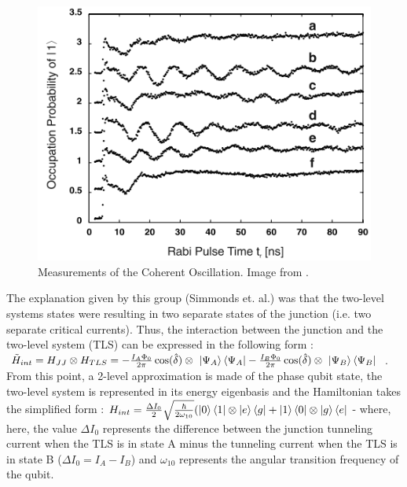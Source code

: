 \documentclass[aps,prl,reprint,groupedaddress]{revtex4-1}
\begin{document}
\begin{figure}%
\includegraphics[width=\columnwidth,natwidth=471,natheight=359]{../CohOsc.png}%
\caption{Measurements of the Coherent Oscillation. Image from \cite{simmonds_decoherence_2004}.}%
\label{CohOsc}%
\end{figure}

The explanation given by this group (Simmonds et. al.) was that the two-level systems states were resulting in two separate states of the junction (i.e. two separate critical currents). Thus, the interaction between the junction and the two-level system (TLS) can be expressed in the following form : $\tilde H_{int} = H_{JJ} \otimes H_{TLS} = -\frac{I_A \Phi_0}{2 \pi} \cos(\hat\delta) \otimes\ \ket{\Psi_A}\bra{\Psi_A} - \frac{I_B \Phi_0}{2 \pi} \cos(\hat \delta) \otimes\ \ket{\Psi_B}\bra{\Psi_B} $ . From this point, a 2-level approximation is made of the phase qubit state, the two-level system is represented in its energy eigenbasis and the Hamiltonian takes the simplified form : $H_{int} = \frac{\Delta I_0}{2} \sqrt{\frac{\hbar}{2\omega_{10}}} (\ket{0}\bra{1}\otimes\ket{e}\bra{g} + \ket{1}\bra{0}\otimes\ket{g}\bra{e}$ - where, here, the value $\Delta I_0$ represents the difference between the junction tunneling current when the TLS is in state A minus the tunneling current when the TLS is in state B ($ \Delta I_0 = I_A - I_B$) and $\omega_{10}$ represents the angular transition frequency of the qubit.
\end{document}
